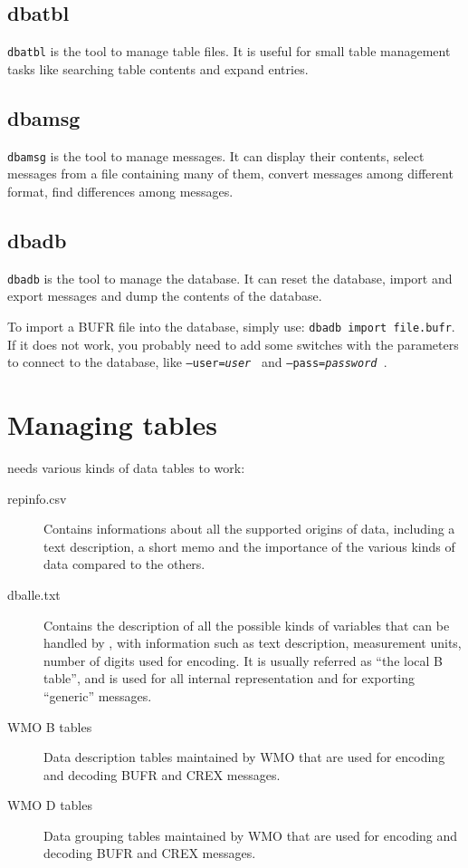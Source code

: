 \subsection{dbatbl}

{\tt dbatbl} is the tool to manage table files.  It is useful for small
table management tasks like searching table contents and expand entries.

\subsection{dbamsg}

{\tt dbamsg} is the tool to manage messages.  It can display their contents,
select messages from a file containing many of them, convert messages among
different format, find differences among messages.

\subsection{dbadb}

{\tt dbadb} is the tool to manage the \dballe{} database.  It can reset the
database, import and export messages and dump the contents of the database.

To import a BUFR file into the database, simply use: {\tt dbadb import
file.bufr}.  If it does not work, you probably need to add some switches with
the parameters to connect to the database, like {\tt --user={\it user} } and
{\tt --pass={\it password} }.

\section {Managing tables}

\dballe{} needs various kinds of data tables to work:

\begin{description}
\item[repinfo.csv]
  Contains informations about all the supported origins of data, including a
  text description, a short memo and the importance of the various kinds of
  data compared to the others.
\item[dballe.txt]
  Contains the description of all the possible kinds of variables that can be
  handled by \dballe{}, with information such as text description, measurement
  units, number of digits used for encoding.  It is usually referred as ``the
  local B table'', and is used for all internal representation and for
  exporting ``generic'' messages.
\item[WMO B tables]
  Data description tables maintained by WMO that are used for encoding and
  decoding BUFR and CREX messages.
\item[WMO D tables]
  Data grouping tables maintained by WMO that are used for encoding and
  decoding BUFR and CREX messages.
\end{description}

